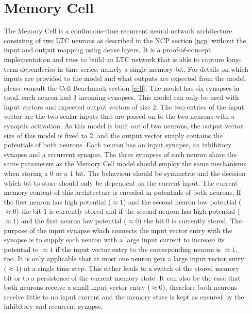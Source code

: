 \documentclass[draft,final]{vutinfth} %
\begin{document}
    \section{Memory Cell} \label{memory_cell}
    The Memory Cell is a continuous-time recurrent neural network architecture consisting of two LTC neurons as described in the NCP section \ref{ncp} without the input and output mapping using dense layers.
    It is a proof-of-concept implementation and tries to build an LTC network \cite{LTCNetworks} that is able to capture long-term dependecies in time series, namely a single memory bit.
    For details on which inputs are provided to the model and what outputs are expected from the model, please consult the Cell Benchmark section \ref{cell}.
    The model has six synapses in total, each neuron had $3$ incoming synapses.
    This model can only be used with input vectors and expected output vectors of size $2$.
    The two entries of the input vector are the two scalar inputs that are passed on to the two neurons with a synaptic activation.
    As this model is built out of two neurons, the output vector size of this model is fixed to $2$, and the output vector simply contains the potentials of both neurons.
    Each neuron has an input synapse, an inhibitory synapse and a recurrent synapse. 
    The three synapses of each neuron share the same parameters as the Memory Cell model should employ the same mechanisms when storing a $0$ or a $1$ bit.
    The behaviour should be symmetric and the decision which bit to store should only be dependent on the current input.
    The current memory content of this architecture is encoded in potentials of both neurons.
    If the first neuron has high potential ($\approx 1$) and the second neuron low potential ($\approx 0$) the bit $1$ is currently stored and if the second neuron has high potential ($\approx 1$) and the first neuron low potential ($\approx 0$) the bit $0$ is currently stored.
    The purpose of the input synapse which connects the input vector entry with the synapse is to supply each neuron with a large input current to increase its potential to $\approx 1$ if the input vector entry to the corresponding neuron is $\approx 1$, too.
    It is only applicable that at most one neuron gets a large input vector entry ($\approx 1$) at a single time step.
    This either leads to a switch of the stored memory bit or to a persistence of the current memory state.
    It can also be the case that both neurons receive a small input vector entry ($\approx 0$), therefore both neurons receive little to no input current and the memory state is kept as ensured by the inhibitory and recurrent synapse.
\end{document}
